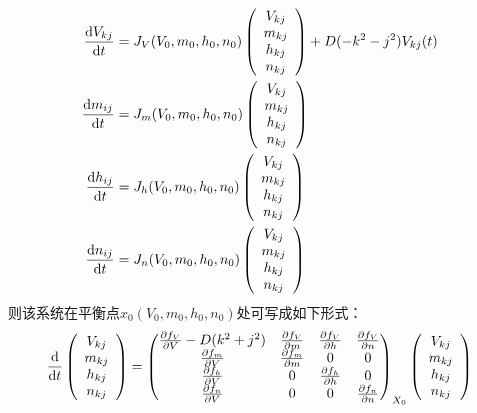 \documentclass[
bachelor,
nofont, %
pdflinks,
]{xjtuthesis}
\begin{document}
\begin{align}
\notag \frac{\mathrm d V_{kj}}{\mathrm d t} &= J_{V}(V_0,m_0,h_0,n_0)
\left(
\begin{array}{c}
V_{kj}\\
m_{kj}\\
h_{kj}\\
n_{kj}
\end{array}
\right)+D(-k^2-j^2)V_{kj}(t)\\
\frac{\mathrm d m_{ij}}{\mathrm d t} &= J_{m}(V_0,m_0,h_0,n_0)
\left(
\begin{array}{c}
V_{kj}\\
m_{kj}\\
h_{kj}\\
n_{kj}
\end{array}
\right) \\
\notag \frac{\mathrm d h_{ij}}{\mathrm d t} &= J_{h}(V_0,m_0,h_0,n_0)
\left(
\begin{array}{c}
V_{kj}\\
m_{kj}\\
h_{kj}\\
n_{kj}
\end{array}
\right)\\
\notag \frac{\mathrm d n_{ij}}{\mathrm d t} &= J_{n}(V_0,m_0,h_0,n_0)
\left(
\begin{array}{c}
V_{kj}\\
m_{kj}\\
h_{kj}\\
n_{kj}
\end{array}
\right) 
\end{align}
则该系统在平衡点$x_0(V_{0},m_{0},h_{0},n_{0})$处可写成如下形式：
\begin{align}
\frac{\mathrm d }{\mathrm d t} \left(\begin{array}{c}
V_{kj}\\
m_{kj}\\
h_{kj}\\
n_{kj}
\end{array}
\right)
=\left(
\begin{matrix} 
\frac{\partial f_V}{\partial V} - D(k^2+j^2) & \frac{\partial f_V}{\partial m} & \frac{\partial f_V}{\partial h} & \frac{\partial f_V}{\partial n}\\ 
\frac{\partial f_m}{\partial V} & \frac{\partial f_m}{\partial m} & 0 & 0\\ 
\frac{\partial f_h}{\partial V} & 0 & \frac{\partial f_h}{\partial h} & 0 \\
\frac{\partial f_n}{\partial V} & 0 & 0 & \frac{\partial f_n}{\partial n}
\end{matrix}
\right)_{X_0}
\left(
\begin{array}{c}
V_{kj}\\
m_{kj}\\
h_{kj}\\
n_{kj}
\end{array}
\right) 
\end{align}
\end{document}
